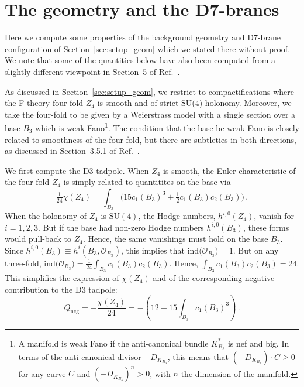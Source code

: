 \documentclass[a4paper,12pt]{article}
\numberwithin{equation}{section}
\newcommand{\mc}{\mathcal}
\newcommand{\be}{\begin{equation}}
\newcommand{\ee}{\end{equation}}
\newcommand{\fthb}{B_3}				%
\newcommand{\cand}[1]{D_{K_{#1}}}		%
\newcommand{\canb}[1]{K_{#1}}			%
\newcommand{\ec}{\chi}				%
\newcommand{\ind}{\mathrm{ind}}		%
\begin{document}
\appendix

\section{The geometry and the D7-branes}
\label{app:geom}

Here we compute some properties of the background geometry and D7-brane configuration of Section~\ref{sec:setup_geom} which we stated there without proof. We note that some of the quantities below have also been computed from a slightly different viewpoint in Section~5 of Ref.~\cite{Collinucci:2008pf}.

As discussed in Section~\ref{sec:setup_geom}, we restrict to compactifications where the F-theory four-fold $Z_4$ is smooth and of strict SU(4) holonomy. Moreover, we take the four-fold to be given by a Weierstrass model with a single section over a base $\fthb$ which is weak Fano\footnote{A manifold is weak Fano if the anti-canonical bundle $\canb{\fthb}^*$ is nef and big. In terms of the anti-canonical divisor $-\cand{\fthb}$, this means that $(-\cand{\fthb}) \cdot C \geq 0$ for any curve $C$ and $(-\cand{\fthb})^n > 0$, with $n$ the dimension of the manifold.}. The condition that the base be weak Fano is closely related to smoothness of the four-fold, but there are subtleties in both directions, as discussed in Section~3.5.1 of Ref.~\cite{Halverson:2015jua}.

We first compute the D3 tadpole. When $Z_4$ is smooth, the Euler characteristic of the four-fold $Z_4$ is simply related to quantitites on the base via \cite{Sethi:1996es}
\be
\tfrac{1}{24}\ec(Z_4) = \int_{\fthb}\big(15c_1(\fthb)^3+\tfrac{1}{2}c_1(\fthb)c_2(\fthb)\big) \,.
\ee
When the holonomy of $Z_4$ is $\mathrm{SU}(4)$, the Hodge numbers, $h^{i,0}(Z_4)$, vanish for $i=1,2,3$. But if the base had non-zero Hodge numbers $h^{i,0}(\fthb)$, these forms would pull-back to $Z_4$. Hence, the same vanishings must hold on the base $\fthb$. Since $h^{i,0}(\fthb) \equiv h^i(\fthb,\mc{O}_{\fthb})$, this implies that $\ind\big(\mc{O}_{\fthb}\big) = 1$. But on any three-fold, $\ind\big(\mc{O}_{\fthb}\big) = \tfrac{1}{24}\int_{\fthb} c_1(\fthb)c_2(\fthb)$. Hence, $\int_{\fthb} c_1(\fthb)c_2(\fthb) = 24$. This simplifies the expression of $\ec(Z_4)$ and of the corresponding negative contribution to the D3 tadpole: 
\be
Q_\mathrm{neg} = - \frac{\ec(Z_4)}{24} = - \left(12 + 15\int_{\fthb}c_1(\fthb)^3\right) \,.
\ee
\end{document}
